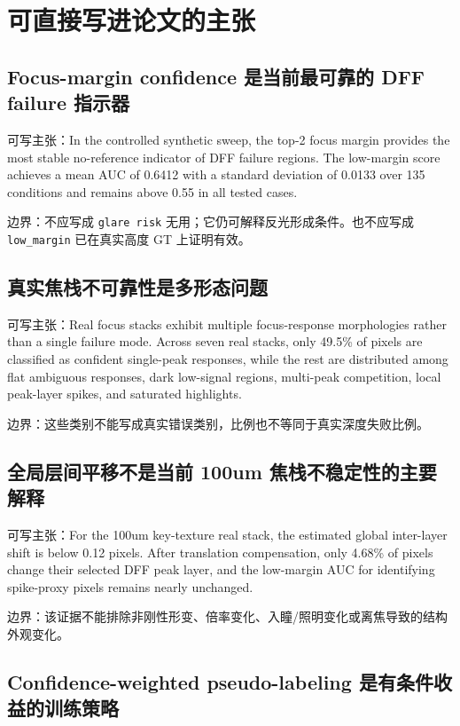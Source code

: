 \documentclass[11pt]{article}
\begin{document}
\section{可直接写进论文的主张}

\subsection{Focus-margin confidence 是当前最可靠的 DFF failure 指示器}

可写主张：In the controlled synthetic sweep, the top-2 focus margin provides the most stable no-reference indicator of DFF failure regions. The low-margin score achieves a mean AUC of 0.6412 with a standard deviation of 0.0133 over 135 conditions and remains above 0.55 in all tested cases.

边界：不应写成 \texttt{glare risk} 无用；它仍可解释反光形成条件。也不应写成 \texttt{low\_margin} 已在真实高度 GT 上证明有效。

\subsection{真实焦栈不可靠性是多形态问题}

可写主张：Real focus stacks exhibit multiple focus-response morphologies rather than a single failure mode. Across seven real stacks, only 49.5\% of pixels are classified as confident single-peak responses, while the rest are distributed among flat ambiguous responses, dark low-signal regions, multi-peak competition, local peak-layer spikes, and saturated highlights.

边界：这些类别不能写成真实错误类别，比例也不等同于真实深度失败比例。

\subsection{全局层间平移不是当前 100um 焦栈不稳定性的主要解释}

可写主张：For the 100um key-texture real stack, the estimated global inter-layer shift is below 0.12 pixels. After translation compensation, only 4.68\% of pixels change their selected DFF peak layer, and the low-margin AUC for identifying spike-proxy pixels remains nearly unchanged.

边界：该证据不能排除非刚性形变、倍率变化、入瞳/照明变化或离焦导致的结构外观变化。

\subsection{Confidence-weighted pseudo-labeling 是有条件收益的训练策略}
\end{document}
